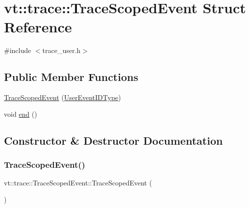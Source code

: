 \hypertarget{structvt_1_1trace_1_1_trace_scoped_event}{}\section{vt\+:\+:trace\+:\+:Trace\+Scoped\+Event Struct Reference}
\label{structvt_1_1trace_1_1_trace_scoped_event}


{\ttfamily \#include $<$trace\+\_\+user.\+h$>$}

\subsection*{Public Member Functions}
\begin{DoxyCompactItemize}
\item 
\hyperlink{structvt_1_1trace_1_1_trace_scoped_event_a24bcc4470b83bf3e573164bbc71bb995}{Trace\+Scoped\+Event} (\hyperlink{namespacevt_1_1trace_a5908920d051c144c89f17c69ed262350}{User\+Event\+I\+D\+Type})
\item 
void \hyperlink{structvt_1_1trace_1_1_trace_scoped_event_af1c826007629d7a7ec77070cca809697}{end} ()
\end{DoxyCompactItemize}


\subsection{Constructor \& Destructor Documentation}
\mbox{\label{structvt_1_1trace_1_1_trace_scoped_event_a24bcc4470b83bf3e573164bbc71bb995}} 
\subsubsection{\texorpdfstring{Trace\+Scoped\+Event()}{TraceScopedEvent()}}
{\footnotesize\ttfamily vt\+::trace\+::\+Trace\+Scoped\+Event\+::\+Trace\+Scoped\+Event (\begin{DoxyParamCaption}\item[{\hyperlink{namespacevt_1_1trace_a5908920d051c144c89f17c69ed262350}{User\+Event\+I\+D\+Type}}]{ }\end{DoxyParamCaption})\hspace{0.3cm}{\ttfamily [inline]}}



